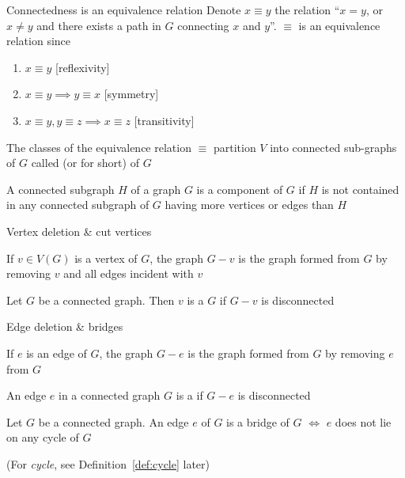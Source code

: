 \documentclass[aspectratio=169]{beamer}\usepackage[]{graphicx}\usepackage[]{xcolor}
\begin{document}
\begin{frame}{Connectedness is an equivalence relation}
	Denote $x\equiv y$ the relation  ``$x=y$, or $x\neq y$ and there exists a path in $G$ connecting $x$ and $y$''. $\equiv$ is an equivalence relation since
	\begin{enumerate}
		\item $x\equiv y$ \hfill[reflexivity]
		\item $x\equiv y\implies y\equiv x$ \hfill[symmetry]
		\item $x\equiv y, y\equiv z\implies x\equiv z$ \hfill[transitivity]
	\end{enumerate}
	\vfill
	\begin{definition}
		The classes of the equivalence relation $\equiv$ partition $V$ into connected sub-graphs of $G$ called  (or  for short) of $G$
	\end{definition}
	\vfill
	A connected subgraph $H$ of a graph $G$ is a component of $G$ if $H$ is not contained in any connected subgraph of $G$ having more vertices or edges than $H$
\end{frame}



\begin{frame}{Vertex deletion \& cut vertices}
\begin{definition}
If $v\in V(G)$ is a vertex of $G$, the graph $G-v$ is the graph formed from $G$ by removing $v$ and all edges incident with $v$
\end{definition}
\vfill
\begin{definition}
	Let $G$ be a connected graph. Then $v$ is a  $G$ if $G-v$ is disconnected
\end{definition}
\end{frame}


\begin{frame}{Edge deletion \& bridges}
\begin{definition}
	If $e$ is an edge of $G$, the graph $G-e$ is the graph formed from $G$ by removing $e$ from $G$
\end{definition}
\vfill
\begin{definition}[{Bridge}]
An edge $e$ in a connected graph $G$ is a  if $G-e$ is disconnected
\end{definition}
\vfill
\begin{theorem}
Let $G$ be a connected graph. An edge $e$ of $G$ is a bridge of $G$ $\iff$ $e$ does not lie on any cycle of $G$
\end{theorem}
(For \emph{cycle}, see Definition~\ref{def:cycle} later)
\end{frame}
\end{document}
